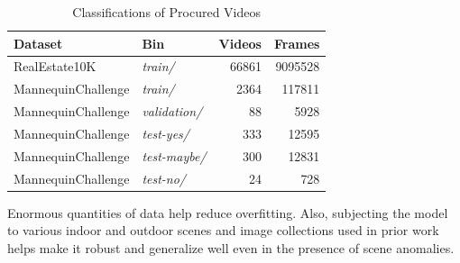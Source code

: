 \begin{table}[t]
    \centering
    \begin{tabular}{L|M|N|N}
    \toprule
  
    \textbf{Dataset} & \textbf{Bin} & \textbf{Videos} & \textbf{Frames} \\
    
    \midrule
    
    RealEstate10K & \textit{train/} & 66861 & 9095528 \\

    \cmidrule(lr){1-1} \cmidrule(lr){2-2} \cmidrule(lr){3-3} \cmidrule(lr){4-4}
    
    MannequinChallenge & \textit{train/} & 2364 & 117811 \\
    
    \cmidrule(lr){1-1} \cmidrule(lr){2-2} \cmidrule(lr){3-3} \cmidrule(lr){4-4}
    
    MannequinChallenge & \textit{validation/} & 88 & 5928 \\
    
    \cmidrule(lr){1-1} \cmidrule(lr){2-2} \cmidrule(lr){3-3} \cmidrule(lr){4-4}
    
    MannequinChallenge & \textit{test-yes/} & 333 & 12595 \\
    
    \cmidrule(lr){1-1} \cmidrule(lr){2-2} \cmidrule(lr){3-3} \cmidrule(lr){4-4}
    
    MannequinChallenge & \textit{test-maybe/} & 300 & 12831 \\
    
    \cmidrule(lr){1-1} \cmidrule(lr){2-2} \cmidrule(lr){3-3} \cmidrule(lr){4-4}
    
    MannequinChallenge & \textit{test-no/} & 24 & 728 \\
    
    \bottomrule
    \end{tabular}
    \caption{Classifications of Procured Videos}
    \label{tab:video-classifications}
    {\small Enormous quantities of data help reduce overfitting. Also, subjecting the model to various indoor and outdoor scenes and image collections used in prior work helps make it robust and generalize well even in the presence of scene anomalies.}
\end{table}

